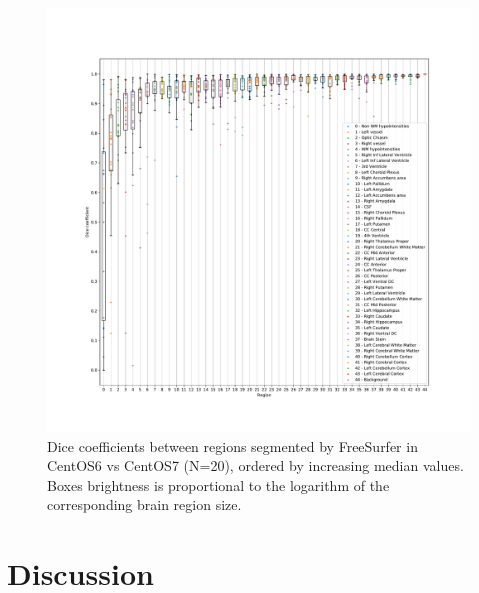 \documentclass[a4paper,num-refs]{oup-contemporary}
\begin{document}
\begin{figure}
  \hspace*{-1cm}
  \includegraphics[width=1.1\linewidth]{figures/dice_regions.pdf}
    \caption{Dice coefficients between regions segmented by FreeSurfer in CentOS6 vs CentOS7 (N=20), ordered by increasing 
    median values. Boxes brightness is proportional to the logarithm of the corresponding brain region size.}
    \label{fig:scatter_plot}
  \end{figure}

  

\section{Discussion}
\end{document}
